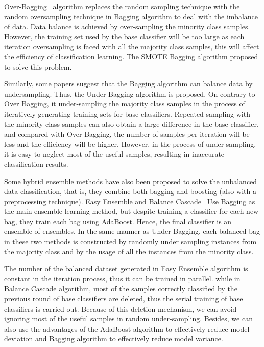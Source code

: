 Over-Bagging~\cite{ref_22} algorithm replaces the random sampling technique with the random oversampling technique in Bagging algorithm to deal with the imbalance of data. Data balance is achieved by over-sampling the minority class samples. However, the training set used by the base classifier will be too large as each iteration oversampling is faced with all the majority class samples, this will affect the efficiency of classification learning. The SMOTE Bagging algorithm proposed to solve this problem.

Similarly, some papers suggest that the Bagging algorithm can balance data by undersampling. Thus, the Under-Bagging algorithm is proposed. On contrary to Over Bagging, it under-sampling the majority class samples in the process of iteratively generating training sets for base classifiers. Repeated sampling with the minority class samples can also obtain a large difference in the base classifier, and compared with Over Bagging, the number of samples per iteration will be less and the efficiency will be higher. However, in the process of under-sampling, it is easy to neglect most of the useful samples, resulting in inaccurate classification results. 

Some hybrid ensemble methods have also been proposed to solve the unbalanced data classification, that is, they combine both bagging and boosting (also with a preprocessing technique). Easy Ensemble and Balance Cascade~\cite{ref_7} Use Bagging as the main ensemble learning method, but despite training a classiﬁer for each new bag, they train each bag using AdaBoost. Hence, the ﬁnal classiﬁer is an ensemble of ensembles. In the same manner as Under Bagging, each balanced bag in these two methods is constructed by randomly under sampling instances from the majority class and by the usage of all the instances from the minority class.

The number of the balanced dataset generated in Easy Ensemble algorithm is constant in the iteration process, thus it can be trained in parallel. while in Balance Cascade algorithm, most of the samples correctly classified by the previous round of base classifiers are deleted, thus the serial training of base classifiers is carried out. Because of this deletion mechanism, we can avoid ignoring most of the useful samples in random under-sampling. Besides, we can also use the advantages of the AdaBoost algorithm to effectively reduce model deviation and Bagging algorithm to effectively reduce model variance.


